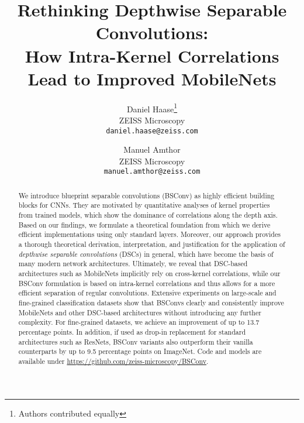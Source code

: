 \documentclass[10pt,twocolumn,letterpaper]{article}
\newcommand{\DCCK}{BSConv\xspace}
\begin{document}
\setlength{\abovedisplayskip}{5pt}
\setlength{\belowdisplayskip}{5pt}
\setlength{\abovedisplayskip}{5pt}
\setlength{\belowdisplayskip}{5pt}



\title{Rethinking Depthwise Separable Convolutions:\\How Intra-Kernel Correlations Lead to Improved MobileNets}

\author{Daniel Haase\thanks{Authors contributed equally}\\
ZEISS Microscopy\\
{\tt\small daniel.haase@zeiss.com}
\and
Manuel Amthor\\
ZEISS Microscopy\\
{\tt\small manuel.amthor@zeiss.com}
}

\maketitle
\thispagestyle{empty}



\begin{abstract}
We introduce blueprint separable convolutions (\DCCK) as highly efficient building blocks for CNNs.
They are motivated by quantitative analyses of kernel properties from trained models, which show the dominance of correlations along the depth axis.
Based on our findings, we formulate a theoretical foundation from which we derive efficient implementations using only standard layers.
Moreover, our approach provides a thorough theoretical derivation, interpretation, and justification for the application of \textit{depthwise separable convolutions} (DSCs) in general, which have become the basis of many modern network architectures.
Ultimately, we reveal that DSC-based architectures such as MobileNets implicitly rely on cross-kernel correlations, while our \DCCK formulation is based on intra-kernel correlations and thus allows for a more efficient separation of regular convolutions.
Extensive experiments on large-scale and fine-grained classification datasets show that \DCCK{}s clearly and consistently improve MobileNets and other DSC-based architectures without introducing any further complexity.
For fine-grained datasets, we achieve an improvement of up to 13.7 percentage points. 
In addition, if used as drop-in replacement for standard architectures such as ResNets, \DCCK variants also outperform their vanilla counterparts by up to 9.5 percentage points on ImageNet.
Code and models are available under \url{https://github.com/zeiss-microscopy/BSConv}.
\end{abstract}
\vspace{-1.25em}
\end{document}
